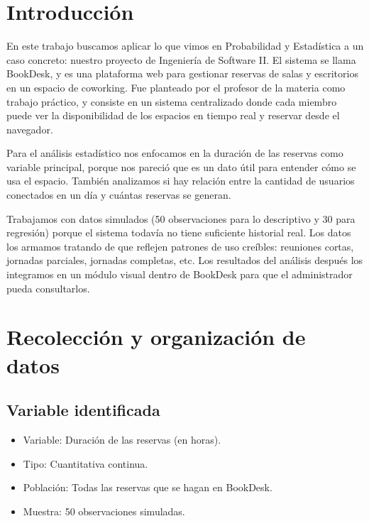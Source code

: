 \documentclass[12pt,a4paper]{article}
\begin{document}
\section*{Introducción}

En este trabajo buscamos aplicar lo que vimos en Probabilidad y Estadística a un caso concreto: nuestro proyecto de Ingeniería de Software II. El sistema se llama BookDesk, y es una plataforma web para gestionar reservas de salas y escritorios en un espacio de coworking. Fue planteado por el profesor de la materia como trabajo práctico, y consiste en un sistema centralizado donde cada miembro puede ver la disponibilidad de los espacios en tiempo real y reservar desde el navegador.

Para el análisis estadístico nos enfocamos en la duración de las reservas como variable principal, porque nos pareció que es un dato útil para entender cómo se usa el espacio. También analizamos si hay relación entre la cantidad de usuarios conectados en un día y cuántas reservas se generan.

Trabajamos con datos simulados (50 observaciones para lo descriptivo y 30 para regresión) porque el sistema todavía no tiene suficiente historial real. Los datos los armamos tratando de que reflejen patrones de uso creíbles: reuniones cortas, jornadas parciales, jornadas completas, etc. Los resultados del análisis después los integramos en un módulo visual dentro de BookDesk para que el administrador pueda consultarlos.

\section{Recolección y organización de datos}

\subsection{Variable identificada}

\begin{itemize}[itemsep=4pt]
  \item Variable: Duración de las reservas (en horas).
  \item Tipo: Cuantitativa continua.
  \item Población: Todas las reservas que se hagan en BookDesk.
  \item Muestra: 50 observaciones simuladas.
\end{itemize}
\end{document}
